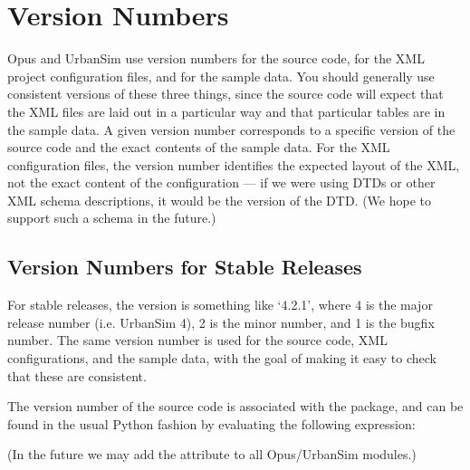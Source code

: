 
\chapter{Version Numbers}
\label{appendix:version-numbers}

Opus and UrbanSim use version numbers for the source code, for the XML
project configuration files, and for the sample data.  You should generally
use consistent versions of these three things, since the source code will
expect that the XML files are laid out in a particular way and that
particular tables are in the sample data.  A given version number
corresponds to a specific version of the source code and the exact contents
of the sample data.  For the XML configuration files, the version number
identifies the expected layout of the XML, not the exact content of the
configuration --- if we were using DTDs or other XML schema descriptions,
it would be the version of the DTD\@.  (We hope to support such a schema in
the future.)

\section{Version Numbers for Stable Releases}

For stable releases, the version is something like `4.2.1', where 4 is the
major release number (i.e. UrbanSim 4), 2 is the minor number, and 1 is the
bugfix number.  The same version number is used for the source code, XML
configurations, and the sample data, with the goal of making it easy to
check that these are consistent.

The version number of the source code is associated with the
 package, and can be found in the usual Python fashion
by evaluating the following expression:


(In the future we may add the  attribute to all
Opus/UrbanSim modules.)

